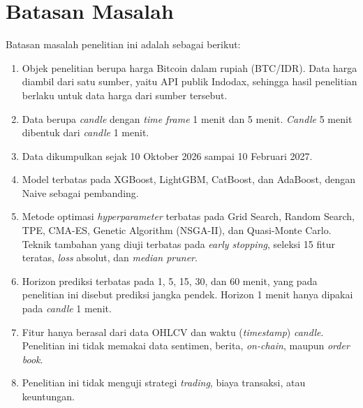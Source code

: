 \section{Batasan Masalah}
\label{sec:batasan}
Batasan masalah penelitian ini adalah sebagai berikut:
\begin{enumerate}
  \item Objek penelitian berupa harga Bitcoin dalam rupiah (BTC/IDR). Data
        harga diambil dari satu sumber, yaitu API publik Indodax, sehingga
        hasil penelitian berlaku untuk data harga dari sumber tersebut.
  \item Data berupa \textit{candle} dengan \textit{time frame} 1 menit dan
        5 menit.
        \textit{Candle} 5 menit dibentuk dari \textit{candle} 1 menit.
  \item Data dikumpulkan sejak 10 Oktober 2026 sampai 10 Februari 2027.
  \item Model terbatas pada XGBoost, LightGBM, CatBoost, dan AdaBoost, dengan
        Naive sebagai pembanding.
  \item Metode optimasi \textit{hyperparameter} terbatas pada Grid Search,
        Random Search, TPE, CMA-ES, Genetic Algorithm (NSGA-II), dan
        Quasi-Monte Carlo. Teknik tambahan yang diuji terbatas pada
        \textit{early stopping}, seleksi 15 fitur teratas, \textit{loss}
        absolut, dan \textit{median pruner}.
  \item Horizon prediksi terbatas pada 1, 5, 15, 30, dan 60 menit, yang
        pada penelitian ini disebut prediksi jangka pendek.
        Horizon 1 menit hanya dipakai pada \textit{candle} 1 menit.
  \item Fitur hanya berasal dari data OHLCV dan waktu (\textit{timestamp})
        \textit{candle}.
        Penelitian ini tidak memakai data sentimen, berita, \textit{on-chain},
        maupun \textit{order book}.
  \item Penelitian ini tidak menguji strategi \textit{trading}, biaya transaksi, atau
        keuntungan.
\end{enumerate}
